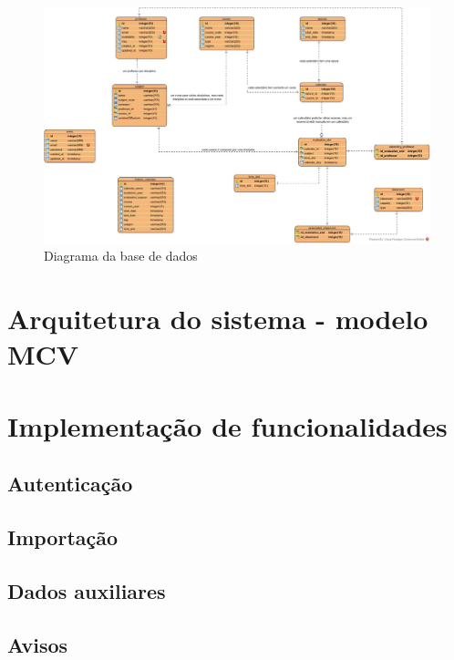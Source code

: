 \documentclass[12pt, twoside]{report}
\begin{document}
	\clearpage
	\begin{landscape}
		\pagestyle{empty}
		
		\begin{figure}[H] 
			\centering 			\includegraphics[width=1.4\textwidth,height=1.4\textheight,keepaspectratio]{image/databaseDiagram}
			\caption{Diagrama da base de dados}
			\label{planeamentoinicial}
			
		\end{figure}
		
		
	\end{landscape}
	
	\section{Arquitetura do sistema - modelo MCV}
	
	
	\section{Implementação de funcionalidades}

	\subsection{Autenticação}	
	\subsection{Importação}
	\subsection{Dados auxiliares}
	\subsection{Avisos}
\end{document}
